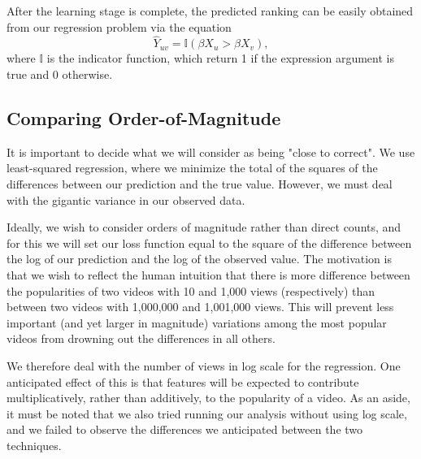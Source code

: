 After the learning stage is complete, the predicted ranking can be easily obtained from our regression problem via the equation
\begin{equation}
\hat{Y}_{uv} = \mathbb{I}(\beta X_u > \beta X_v),
\end{equation}
where $\mathbb{I}$ is the indicator function, which return 1 if the expression argument is true and 0 otherwise.

\subsection{Comparing Order-of-Magnitude}
\label{sec:orderofmagnitude}
	It is important to decide what we will consider as being "close to correct".  We use least-squared regression, where we minimize the total of the squares of the differences between our prediction and the true value.  However, we must deal with the gigantic variance in our observed data.

	Ideally, we wish to consider orders of magnitude rather than direct counts, and for this we will set our loss function equal to the square of the difference between the log of our prediction and the log of the observed value.  The motivation is that we wish to reflect the human intuition that there is more difference between the popularities of two videos with 10 and 1,000 views (respectively) than between two videos with 1,000,000 and 1,001,000 views.  This will prevent less important (and yet larger in magnitude) variations among the most popular videos from drowning out the differences in all others.

	We therefore deal with the number of views in log scale for the regression.  One anticipated effect of this is that features will be expected to contribute multiplicatively, rather than additively, to the popularity of a video.  As an aside, it must be noted that we also tried running our analysis without using log scale, and we failed to observe the differences we anticipated between the two techniques.